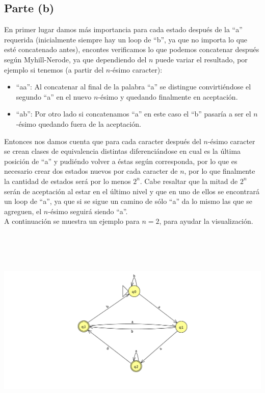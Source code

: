\documentclass[11pt,letterpaper]{article}
\begin{document}
\subsection{Parte (b)}
En primer lugar damos más importancia para cada estado después de la ``a'' requerida (inicialmente siempre hay un loop de ``b'', ya que no importa lo que esté concatenado antes), encontes verificamos lo que podemos concatenar después según Myhill-Nerode, ya que dependiendo del $n$ puede variar el resultado, por ejemplo si tenemos (a partir del $n$-ésimo caracter):
\begin{itemize}
\item{``aa'': Al concatenar al final de la palabra ``a'' se distingue convirtiéndose el segundo ``a'' en el nuevo $n$-ésimo y quedando finalmente en aceptación.}
\item{``ab'': Por otro lado si concatenamos ``a'' en este caso el ``b'' pasaría a ser el $n$-ésimo quedando fuera de la aceptación.}
\end{itemize}
Entonces nos damos cuenta que para cada caracter después del $n$-ésimo caracter se crean clases de equivalencia distintas diferenciándose en cual es la última posición de ``a'' y pudiéndo volver a éstas según corresponda, por lo que es necesario crear dos estados nuevos por cada caracter de $n$, por lo que finalmente la cantidad de estados será por lo menos $2^n$. Cabe resaltar que la mitad de $2^n$ serán de aceptación al estar en el último nivel y que en uno de ellos se encontrará un loop de ``a'', ya que si se sigue un camino de sólo ``a'' da lo mismo las que se agreguen, el $n$-ésimo seguirá siendo ``a''. \\

A continuación se muestra un ejemplo para $n = 2$, para ayudar la visualización.

\includegraphics[height=10cm]{tarea_4-b.png}
\end{document}
